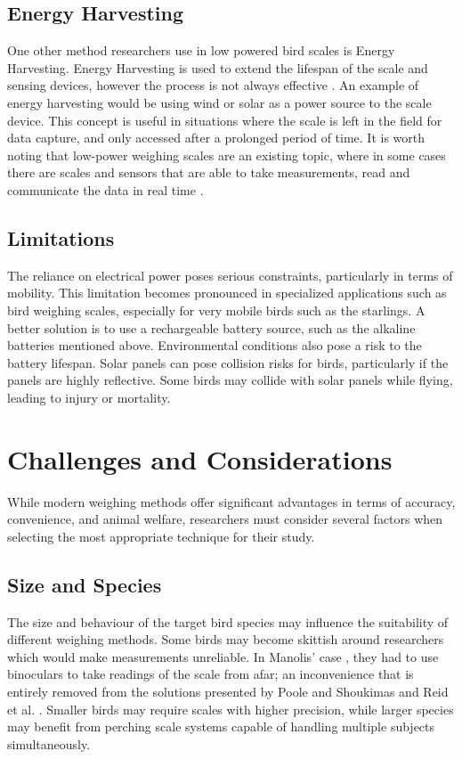 \documentclass[class=report,11pt,crop=false]{standalone}
\begin{document}
\subsection{Energy Harvesting}
One other method researchers use in low powered bird scales is Energy Harvesting. Energy Harvesting is used to extend the lifespan of the scale and sensing devices, however the process is not always effective \cite{EnergyHarvesting}. An example of energy harvesting would be using wind or solar as a power source to the scale device. This concept is useful in situations where the scale is left in the field for data capture, and only accessed after a prolonged period of time. It is worth noting that low-power weighing scales are an existing topic, where in some cases there are scales and sensors that are able to take measurements, read and communicate the data in real time \cite{ImageBased}. 

\subsection{Limitations}
The reliance on electrical power poses serious constraints, particularly in terms of mobility. This limitation becomes pronounced in specialized applications such as bird weighing scales, especially for very mobile birds such as the starlings. A better solution is to use a rechargeable battery source, such as the alkaline batteries mentioned above. Environmental conditions also pose a risk to the battery lifespan. Solar panels can pose collision risks for birds, particularly if the panels are highly reflective. Some birds may collide with solar panels while flying, leading to injury or mortality.
 

\section{Challenges and Considerations}
While modern weighing methods offer significant advantages in terms of accuracy, convenience, and animal welfare, researchers must consider several factors when selecting the most appropriate technique for their study.

\subsection{Size and Species}
The size and behaviour of the target bird species may influence the suitability of different weighing methods. Some birds may become skittish around researchers which would make measurements unreliable. In Manolis’ case \cite{manoils2024simple}, they had to use binoculars to take readings of the scale from afar; an inconvenience that is entirely removed from the solutions presented by Poole and Shoukimas \cite{poole1982scale} and Reid et al. \cite{reid1999measurement}. Smaller birds may require scales with higher precision, while larger species may benefit from perching scale systems capable of handling multiple subjects simultaneously.
\end{document}
